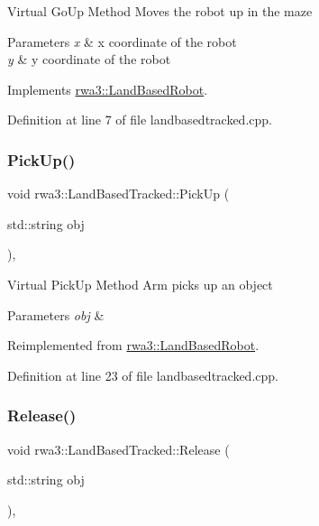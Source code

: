 Virtual Go\+Up Method Moves the robot up in the maze 
\begin{DoxyParams}{Parameters}
{\em x} & x coordinate of the robot \\
\hline
{\em y} & y coordinate of the robot \\
\hline
\end{DoxyParams}


Implements \hyperlink{classrwa3_1_1_land_based_robot_a955b0741cce58648074edff80ac1ce29}{rwa3\+::\+Land\+Based\+Robot}.



Definition at line 7 of file landbasedtracked.\+cpp.

\mbox{\label{classrwa3_1_1_land_based_tracked_af1e65be827430cd9281e982409ebedcb}} 
\subsubsection{\texorpdfstring{Pick\+Up()}{PickUp()}}
{\footnotesize\ttfamily void rwa3\+::\+Land\+Based\+Tracked\+::\+Pick\+Up (\begin{DoxyParamCaption}\item[{std\+::string}]{obj }\end{DoxyParamCaption})\hspace{0.3cm}{\ttfamily [override]}, {\ttfamily [virtual]}}

Virtual Pick\+Up Method Arm picks up an object 
\begin{DoxyParams}{Parameters}
{\em obj} & \\
\hline
\end{DoxyParams}


Reimplemented from \hyperlink{classrwa3_1_1_land_based_robot_adf0c76440e2f9d2ea5cbe7193cddfe2b}{rwa3\+::\+Land\+Based\+Robot}.



Definition at line 23 of file landbasedtracked.\+cpp.

\mbox{\label{classrwa3_1_1_land_based_tracked_a89dbcac8ec2fd64c6b168167cd6363a4}} 
\subsubsection{\texorpdfstring{Release()}{Release()}}
{\footnotesize\ttfamily void rwa3\+::\+Land\+Based\+Tracked\+::\+Release (\begin{DoxyParamCaption}\item[{std\+::string}]{obj }\end{DoxyParamCaption})\hspace{0.3cm}{\ttfamily [override]}, {\ttfamily [virtual]}}

